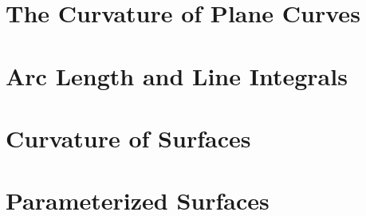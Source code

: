\section{The Curvature of Plane Curves}

\section{Arc Length and Line Integrals}

\section{Curvature of Surfaces}

\setcounter{section}{13}
\section{Parameterized Surfaces}

